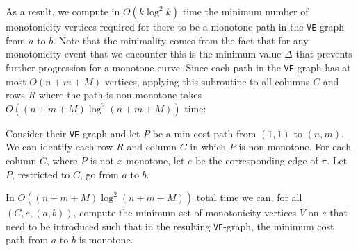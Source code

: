 As a result, we compute in $O(k \log^2 k)$ time the minimum number of monotonicity vertices required for there to be a monotone path in the \texttt{VE}-graph from $a$ to $b$. Note that the minimality comes from the fact that for any monotonicity event that we encounter this is the minimum value $\Delta$ that prevents further progression for a monotone curve. 
Since each path in the \texttt{VE}-graph has at most $O(n + m + M)$ vertices, applying this subroutine to all columns $C$ and rows $R$ where the path is non-monotone takes $O( (n + m + M) \log^2 (n + m + M))$ time:

\begin{lemma}
    Consider their \texttt{VE}-graph and let $P$ be a min-cost path from $(1, 1)$ to $(n, m)$. 
We can identify each row $R$ and column $C$ in which $P$ is non-monotone.
For each column $C$, where $P$ is not $x$-monotone, let $e$ be the corresponding edge of $\pi$. Let $P$, restricted to $C$, go from $a$ to $b$.

In $O( (n + m + M) \log^2 (n + m + M))$ total time we can, for all $(C, e, (a, b))$,  compute the minimum set of monotonicity vertices $V$ on $e$ that need to be introduced such that in the resulting \texttt{VE}-graph, the minimum cost path from $a$ to $b$ is monotone. 
\end{lemma}





